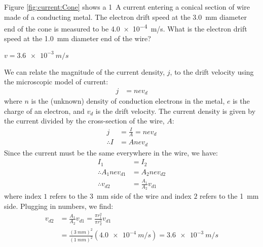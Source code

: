 \question Figure \ref{fig:current:Cone} shows a \SI{1}{A} current entering a conical section of wire made of a conducting metal. The electron drift speed at the \SI{3.0}{mm} diameter end of the cone is measured to be \SI{4.0e-4}{m/s}. What is the electron drift speed at the \SI{1.0}{mm} diameter end of the wire?
\begin{finalanswer}
$v=\SI{3.6e-3}{m/s}$
\end{finalanswer}
\begin{solution}
We can relate the magnitude of the current density, $j$, to the drift velocity using the microscopic model of current:
\begin{align*}
j &= nev_d
\end{align*}
where $n$ is the (unknown) density of conduction electrons in the metal, $e$ is the charge of an electron, and $v_d$ is the drift velocity. The current density is given by the current divided by the cross-section of the wire, $A$:
\begin{align*}
j &=\frac{I}{A}=nev_d\\
\therefore I&=Anev_d
\end{align*}
Since the current must be the same everywhere in the wire, we have:
\begin{align*}
I_1 &= I_2\\
\therefore A_1nev_{d1} &= A_2nev_{d2}\\
\therefore v_{d2} &=\frac{A_1}{A_2}v_{d1}
\end{align*}
where index $1$ refers to the \SI{3}{mm} side of the wire and index $2$ refers to the \SI{1}{mm} side. Plugging in numbers, we find:
\begin{align*}
v_{d2} &=\frac{A_1}{A_2}v_{d1} =\frac{\pi r_1^2}{\pi r_2^2}v_{d1}\\
&=\frac{(\SI{3}{mm})^2}{(\SI{1}{mm})^2}(\SI{4.0e-4}{m/s})=\SI{3.6e-3}{m/s}
\end{align*} 

\end{solution}

